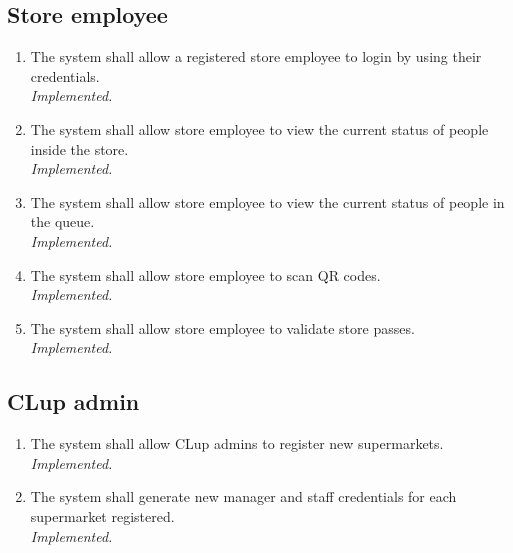 \subsection{Store employee}
\begin{enumerate}[resume*=requirements]
    \item The system shall allow a registered store employee to login by using their credentials.\\[4pt] \textit{Implemented.}
    \item The system shall allow store employee to view the current status of people inside the store.\\[4pt] \textit{Implemented.}
    \item The system shall allow store employee to view the current status of people in the queue.\\[4pt] \textit{Implemented.}
    \item The system shall allow store employee to scan QR codes.\\[4pt] \textit{Implemented.}
    \item The system shall allow store employee to validate store passes.\\[4pt] \textit{Implemented.}
\end{enumerate}

\subsection{CLup admin}
\begin{enumerate}[resume*=requirements]
    \item The system shall allow CLup admins to register new supermarkets.\\[4pt] \textit{Implemented.}
    \item The system shall generate new manager and staff credentials for each supermarket registered.\\[4pt] \textit{Implemented.}
\end{enumerate}